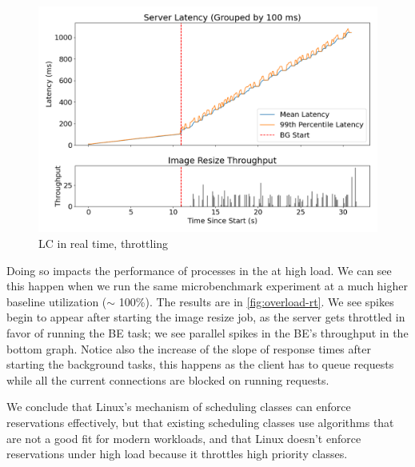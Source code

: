 \begin{figure}[t]
    \centering
    \includegraphics[width=\columnwidth]{graphs/overload-rt.png}
    \caption{LC in real time, throttling}\label{fig:overload-rt}
\end{figure}



Doing so impacts the performance of processes in the \rtclass{} at high load. We
can see this happen when we run the same microbenchmark experiment at a much
higher baseline utilization ($\sim$ 100\%). The results are in
\autoref{fig:overload-rt}. We see spikes begin to appear after starting the
image resize job, as the \rtclass{} server gets throttled in favor of running
the BE task; we see parallel spikes in the BE's throughput in the bottom graph.
Notice also the increase of the slope of response times after starting the
background tasks, this happens as the client has to queue requests while all the
current connections are blocked on running requests.

We conclude that Linux's mechanism of scheduling classes can enforce
reservations effectively, but that existing scheduling classes use algorithms
that are not a good fit for modern workloads, and that Linux doesn't enforce
reservations under high load because it throttles high priority classes.
